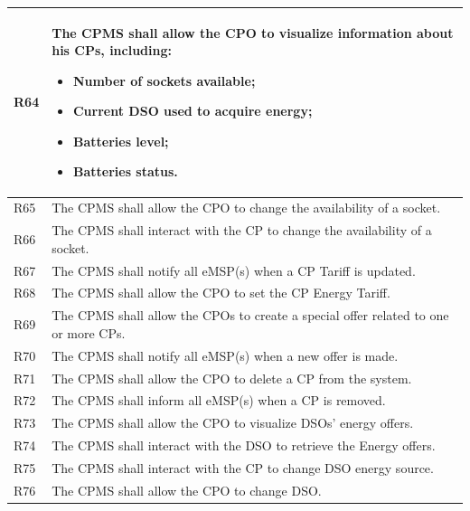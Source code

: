 \documentclass{Configuration_Files/PoliMi3i_thesis}
\begin{document}
\begin{xltabular}{\textwidth}{| >{}l | X |}
R64  &
    The CPMS shall allow the CPO to visualize information about his CPs, including:
    \begin{itemize}
        \item Number of sockets available;
        \item Current DSO used to acquire energy;
        \item Batteries level;
        \item Batteries status.
    \end{itemize}\B\\
\hline


R65 &
    The CPMS shall allow the CPO to change the availability of a socket.\B\\
\hline

R66 &
    The CPMS shall interact with the CP to change the availability of a socket.\B\\
\hline

R67 &
    The CPMS  shall notify all eMSP(s) when a CP Tariff is updated.\B\\
    \hline
R68 &
    The CPMS shall allow the CPO to set the CP Energy Tariff.\B\\
\hline
R69  &
    The CPMS shall allow the CPOs to create a special offer related to one or more CPs.\B\\
\hline

R70 &
    The CPMS  shall notify all eMSP(s) when a new offer is made.\B\\
\hline

R71 &
    The CPMS shall allow the CPO to delete a CP from the system.\B\\
\hline

R72  &
    The CPMS shall inform all eMSP(s) when a CP is removed.\B\\
\hline

R73 &
    The CPMS shall allow the CPO to visualize DSOs' energy offers.\B\\
\hline

R74 &
    The CPMS shall interact with the DSO to retrieve the Energy offers.\B\\
\hline

R75 &
    The CPMS shall interact with the CP to change DSO energy source.\B\\
\hline
    
R76 &
    The CPMS shall allow the CPO to change DSO.\B\\
\hline


\end{xltabular}
\end{document}
